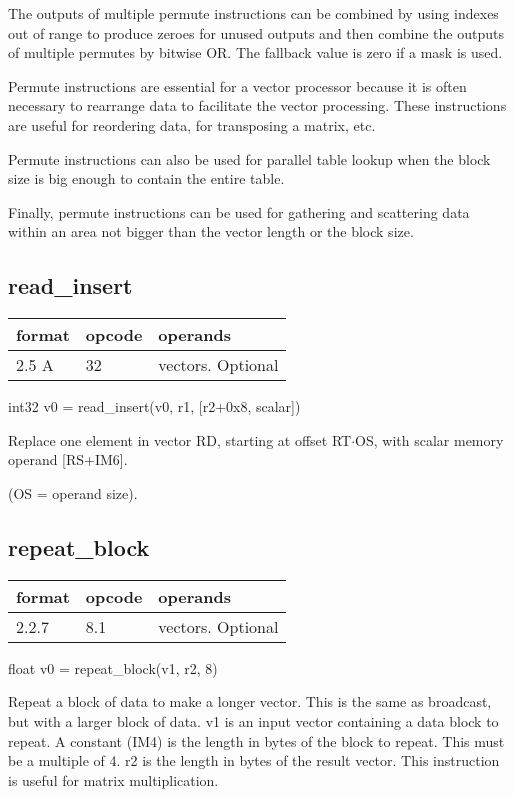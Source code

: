\documentclass[forwardcom.tex]{subfiles}
\begin{document}
The outputs of multiple permute instructions can be combined by using indexes out of range to produce zeroes for unused outputs and then combine the outputs of multiple permutes by bitwise OR. 
The fallback value is zero if a mask is used.
\vv

Permute instructions are essential for a vector processor because it is often necessary to rearrange data to facilitate the vector processing. These instructions are useful for reordering data, for transposing a matrix, etc. 
\vv

Permute instructions can also be used for parallel table lookup when the block size is big enough to contain the entire table.
\vv

Finally, permute instructions can be used for gathering and scattering data within an area not bigger than the vector length or the block size.
\vv

\subsection{read\_insert}
\label{table:readInsertInstruction}
\begin{tabular}{|p{12mm}|p{15mm}|p{100mm}|}
\hline
\bfseries format & \bfseries opcode & \bfseries operands \\ \hline
2.5 A & 32 & vectors. Optional \\ \hline
\end{tabular}
\vv

int32 v0 = read\_insert(v0, r1, [r2+0x8, scalar])
\vv

Replace one element in vector RD, starting
at offset RT$\cdot$OS, with scalar memory operand
[RS+IM6].

(OS = operand size).

\subsection{repeat\_block}
\label{table:repeatBlockInstruction}
\begin{tabular}{|p{12mm}|p{15mm}|p{100mm}|}
\hline
\bfseries format & \bfseries opcode & \bfseries operands \\ \hline
2.2.7 & 8.1 & vectors. Optional \\ \hline
\end{tabular}
\vv

float v0 = repeat\_block(v1, r2, 8) 
\vv

Repeat a block of data to make a longer vector. This is the same as broadcast, but with a larger block of data. v1 is an input vector containing a data block to repeat. A constant (IM4) is the length in bytes of the block to repeat. This must be a multiple of 4. r2 is the length in bytes of the result vector. This instruction is useful for matrix multiplication.
\vv
\end{document}
